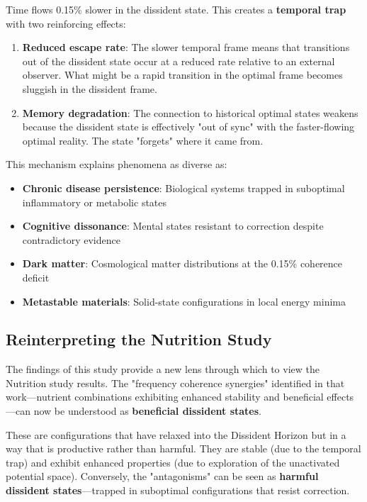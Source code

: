 \documentclass[12pt, a4paper]{article}
\begin{document}
Time flows 0.15\% slower in the dissident state. This creates a \textbf{temporal trap} with two reinforcing effects:

\begin{enumerate}
    \item \textbf{Reduced escape rate}: The slower temporal frame means that transitions out of the dissident state occur at a reduced rate relative to an external observer. What might be a rapid transition in the optimal frame becomes sluggish in the dissident frame.
    
    \item \textbf{Memory degradation}: The connection to historical optimal states weakens because the dissident state is effectively "out of sync" with the faster-flowing optimal reality. The state "forgets" where it came from.
\end{enumerate}

This mechanism explains phenomena as diverse as:
\begin{itemize}
    \item \textbf{Chronic disease persistence}: Biological systems trapped in suboptimal inflammatory or metabolic states
    \item \textbf{Cognitive dissonance}: Mental states resistant to correction despite contradictory evidence
    \item \textbf{Dark matter}: Cosmological matter distributions at the 0.15\% coherence deficit
    \item \textbf{Metastable materials}: Solid-state configurations in local energy minima
\end{itemize}

\subsection{Reinterpreting the Nutrition Study}

The findings of this study provide a new lens through which to view the Nutrition study results. The "frequency coherence synergies" identified in that work—nutrient combinations exhibiting enhanced stability and beneficial effects—can now be understood as \textbf{beneficial dissident states}.

These are configurations that have relaxed into the Dissident Horizon but in a way that is productive rather than harmful. They are stable (due to the temporal trap) and exhibit enhanced properties (due to exploration of the unactivated potential space). Conversely, the "antagonisms" can be seen as \textbf{harmful dissident states}—trapped in suboptimal configurations that resist correction.
\end{document}
